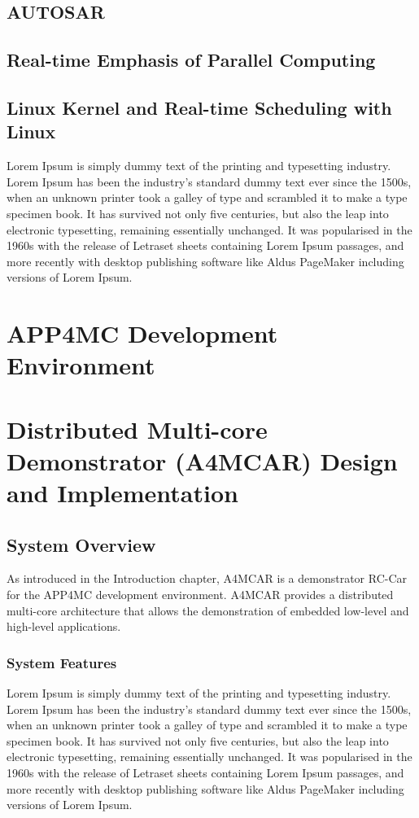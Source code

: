\section{AUTOSAR}
\section{Real-time Emphasis of Parallel Computing}
\section{Linux Kernel and Real-time Scheduling with Linux}
Lorem Ipsum is simply dummy text of the printing and typesetting industry. Lorem Ipsum has been the industry's standard dummy text ever since the 1500s, when an unknown printer took a galley of type and scrambled it to make a type specimen book. It has survived not only five centuries, but also the leap into electronic typesetting, remaining essentially unchanged. It was popularised in the 1960s with the release of Letraset sheets containing Lorem Ipsum passages, and more recently with desktop publishing software like Aldus PageMaker including versions of Lorem Ipsum.

\chapter{APP4MC Development Environment}

\chapter{Distributed Multi-core Demonstrator (A4MCAR) Design and Implementation}
\section{System Overview}
As introduced in the Introduction chapter, A4MCAR is a demonstrator RC-Car for the APP4MC development environment. A4MCAR provides a distributed multi-core architecture that allows the demonstration of embedded low-level and high-level applications. 



\subsection{System Features}
Lorem Ipsum is simply dummy text of the printing and typesetting industry. Lorem Ipsum has been the industry's standard dummy text ever since the 1500s, when an unknown printer took a galley of type and scrambled it to make a type specimen book. It has survived not only five centuries, but also the leap into electronic typesetting, remaining essentially unchanged. It was popularised in the 1960s with the release of Letraset sheets containing Lorem Ipsum passages, and more recently with desktop publishing software like Aldus PageMaker including versions of Lorem Ipsum.

